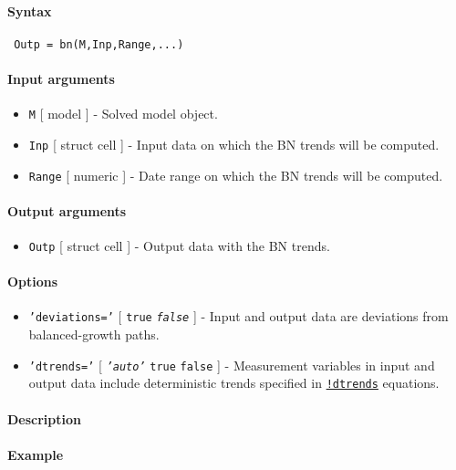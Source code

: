 


	\paragraph{Syntax}
 
 \begin{verbatim}
 Outp = bn(M,Inp,Range,...)
 \end{verbatim}
 
 \paragraph{Input arguments}
 
 \begin{itemize}
 \item
   \texttt{M} {[} model {]} - Solved model object.
 \item
   \texttt{Inp} {[} struct \textbar{} cell {]} - Input data on which the
   BN trends will be computed.
 \item
   \texttt{Range} {[} numeric {]} - Date range on which the BN trends
   will be computed.
 \end{itemize}
 
 \paragraph{Output arguments}
 
 \begin{itemize}
 \item
   \texttt{Outp} {[} struct \textbar{} cell {]} - Output data with the BN
   trends.
 \end{itemize}
 
 \paragraph{Options}
 
 \begin{itemize}
 \item
   \texttt{'deviations='} {[} \texttt{true} \textbar{}
   \emph{\texttt{false}} {]} - Input and output data are deviations from
   balanced-growth paths.
 \item
   \texttt{'dtrends='} {[} \emph{\texttt{'auto'}} \textbar{}
   \texttt{true} \textbar{} \texttt{false} {]} - Measurement variables in
   input and output data include deterministic trends specified in
   \href{modellang/dtrends}{\texttt{!dtrends}} equations.
 \end{itemize}
 
 \paragraph{Description}
 
 \paragraph{Example}


